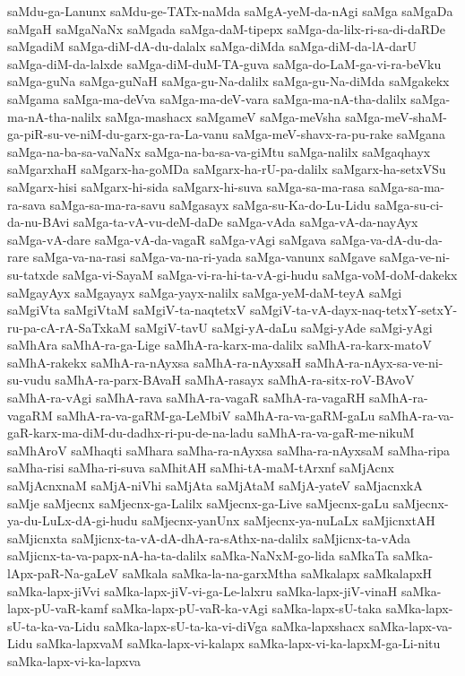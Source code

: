 {saMdu-ga-Lanunx
saMdu-ge-TATx-naMda
saMgA-yeM-da-nAgi
saMga
saMgaDa
saMgaH
saMgaNaNx
saMgada
saMga-daM-tipepx
saMga-da-lilx-ri-sa-di-daRDe
saMgadiM
saMga-diM-dA-du-dalalx
saMga-diMda
saMga-diM-da-lA-darU
saMga-diM-da-lalxde
saMga-diM-duM-TA-guva
saMga-do-LaM-ga-vi-ra-beVku
saMga-guNa
saMga-guNaH
saMga-gu-Na-dalilx
saMga-gu-Na-diMda
saMgakekx
saMgama
saMga-ma-deVva
saMga-ma-deV-vara
saMga-ma-nA-tha-dalilx
saMga-ma-nA-tha-nalilx
saMga-mashacx
saMgameV
saMga-meVsha
saMga-meV-shaM-ga-piR-su-ve-niM-du-garx-ga-ra-La-vanu
saMga-meV-shavx-ra-pu-rake
saMgana
saMga-na-ba-sa-vaNaNx
saMga-na-ba-sa-va-giMtu
saMga-nalilx
saMgaqhayx
saMgarxhaH
saMgarx-ha-goMDa
saMgarx-ha-rU-pa-dalilx
saMgarx-ha-setxVSu
saMgarx-hisi
saMgarx-hi-sida
saMgarx-hi-suva
saMga-sa-ma-rasa
saMga-sa-ma-ra-sava
saMga-sa-ma-ra-savu
saMgasayx
saMga-su-Ka-do-Lu-Lidu
saMga-su-ci-da-nu-BAvi
saMga-ta-vA-vu-deM-daDe
saMga-vAda
saMga-vA-da-nayAyx
saMga-vA-dare
saMga-vA-da-vagaR
saMga-vAgi
saMgava
saMga-va-dA-du-da-rare
saMga-va-na-rasi
saMga-va-na-ri-yada
saMga-vanunx
saMgave
saMga-ve-ni-su-tatxde
saMga-vi-SayaM
saMga-vi-ra-hi-ta-vA-gi-hudu
saMga-voM-doM-dakekx
saMgayAyx
saMgayayx
saMga-yayx-nalilx
saMga-yeM-daM-teyA
saMgi
saMgiVta
saMgiVtaM
saMgiV-ta-naqtetxV
saMgiV-ta-vA-dayx-naq-tetxY-setxY-ru-pa-cA-rA-SaTxkaM
saMgiV-tavU
saMgi-yA-daLu
saMgi-yAde
saMgi-yAgi
saMhAra
saMhA-ra-ga-Lige
saMhA-ra-karx-ma-dalilx
saMhA-ra-karx-matoV
saMhA-rakekx
saMhA-ra-nAyxsa
saMhA-ra-nAyxsaH
saMhA-ra-nAyx-sa-ve-ni-su-vudu
saMhA-ra-parx-BAvaH
saMhA-rasayx
saMhA-ra-sitx-roV-BAvoV
saMhA-ra-vAgi
saMhA-rava
saMhA-ra-vagaR
saMhA-ra-vagaRH
saMhA-ra-vagaRM
saMhA-ra-va-gaRM-ga-LeMbiV
saMhA-ra-va-gaRM-gaLu
saMhA-ra-va-gaR-karx-ma-diM-du-dadhx-ri-pu-de-na-ladu
saMhA-ra-va-gaR-me-nikuM
saMhAroV
saMhaqti
saMhara
saMha-ra-nAyxsa
saMha-ra-nAyxsaM
saMha-ripa
saMha-risi
saMha-ri-suva
saMhitAH
saMhi-tA-maM-tArxnf
saMjAcnx
saMjAcnxnaM
saMjA-niVhi
saMjAta
saMjAtaM
saMjA-yateV
saMjacnxkA
saMje
saMjecnx
saMjecnx-ga-Lalilx
saMjecnx-ga-Live
saMjecnx-gaLu
saMjecnx-ya-du-LuLx-dA-gi-hudu
saMjecnx-yanUnx
saMjecnx-ya-nuLaLx
saMjicnxtAH
saMjicnxta
saMjicnx-ta-vA-dA-dhA-ra-sAthx-na-dalilx
saMjicnx-ta-vAda
saMjicnx-ta-va-papx-nA-ha-ta-dalilx
saMka-NaNxM-go-lida
saMkaTa
saMka-lApx-paR-Na-gaLeV
saMkala
saMka-la-na-garxMtha
saMkalapx
saMkalapxH
saMka-lapx-jiVvi
saMka-lapx-jiV-vi-ga-Le-lalxru
saMka-lapx-jiV-vinaH
saMka-lapx-pU-vaR-kamf
saMka-lapx-pU-vaR-ka-vAgi
saMka-lapx-sU-taka
saMka-lapx-sU-ta-ka-va-Lidu
saMka-lapx-sU-ta-ka-vi-diVga
saMka-lapxshacx
saMka-lapx-va-Lidu
saMka-lapxvaM
saMka-lapx-vi-kalapx
saMka-lapx-vi-ka-lapxM-ga-Li-nitu
saMka-lapx-vi-ka-lapxva
}
